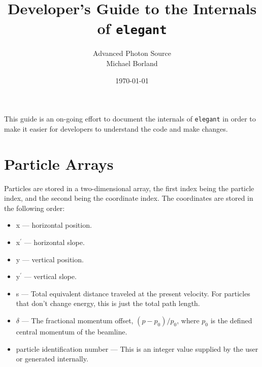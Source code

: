 \documentclass[11pt]{article}
\begin{document}
\title{Developer's Guide to the Internals of {\tt elegant}}
\author{Advanced Photon Source\\Michael Borland\\ \date{\today}}
\maketitle

This guide is an on-going effort to document the internals of {\tt elegant}
in order to make it easier for developers to understand the code and
make changes.

\section{Particle Arrays}

Particles are stored in a two-dimensional array, the first index being
the particle index, and the second being the coordinate index.  The
coordinates are stored in the following order:
\begin{itemize}
\item x --- horizontal position.
\item x$^\prime$ --- horizontal slope.
\item y --- vertical position.
\item y$^\prime$ ---  vertical slope.
\item s --- Total equivalent distance traveled at the present velocity.  For
  particles that don't change energy, this is just the total path length.
\item $\delta$ --- The fractional momentum offset, $(p-p_0)/p_0$, where
  $p_0$ is the defined central momentum of the beamline.
\item particle identification number --- This is an integer value supplied by
  the user or generated internally.
\end{itemize}
\end{document}
